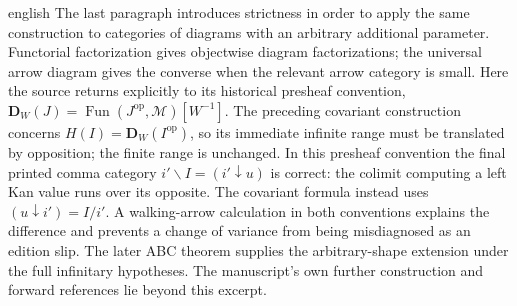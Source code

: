 \begin{otherlanguage*}{english}
The last paragraph introduces strictness in order to apply the same construction to categories of diagrams with an arbitrary additional parameter. Functorial factorization gives objectwise diagram factorizations; the universal arrow diagram gives the converse when the relevant arrow category is small. Here the source returns explicitly to its historical presheaf convention, $\mathbf D_W(J)=\operatorname{Fun}(J^{\mathrm{op}},\mathcal M)[W^{-1}]$. The preceding covariant construction concerns $H(I)=\mathbf D_W(I^{\mathrm{op}})$, so its immediate infinite range must be translated by opposition; the finite range is unchanged. In this presheaf convention the final printed comma category $i'\backslash I=(i'\downarrow u)$ is correct: the colimit computing a left Kan value runs over its opposite. The covariant formula instead uses $(u\downarrow i')=I/i'$. A walking-arrow calculation in both conventions explains the difference and prevents a change of variance from being misdiagnosed as an edition slip. The later ABC theorem supplies the arbitrary-shape extension under the full infinitary hypotheses. The manuscript's own further construction and forward references lie beyond this excerpt.
\end{otherlanguage*}
